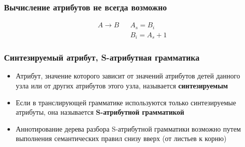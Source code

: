 \documentclass{beamer}
\begin{document}
\begin{frame}[fragile]
  \transwipe[direction=90]
  \frametitle{Вычисление атрибутов не всегда возможно}
$$
\begin{array}{clcl}
&A \rightarrow    B   & & A_s = B_i \\
&                     & & B_i = A_s + 1 
\end{array}
$$  
\end{frame}


\begin{frame}[fragile]
  \transwipe[direction=90]
  \frametitle{Синтезируемый атрибут, S-атрибутная грамматика}
  \begin{itemize}
    \item Атрибут, значение которого зависит от значений атрибутов детей данного узла или от других атрибутов этого узла, называется \textbf{синтезируемым}
    \item Если в транслирующей грамматике используются только синтезируемые атрибуты, она называется \textbf{S-атрибутной грамматикой}
    \item Аннотирование дерева разбора S-атрибутной грамматики возможно путем выполнения семантических правил снизу вверх (от листьев к корню)
  \end{itemize}    
  
\end{frame}
\end{document}
